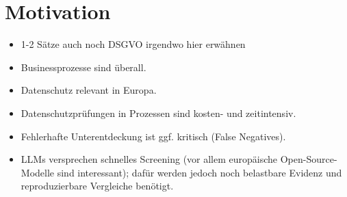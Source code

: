 \section{Motivation}\label{sec:motivation}
\begin{itemize}
    \item 1-2 Sätze auch noch DSGVO irgendwo hier erwähnen
    \item Businessprozesse sind überall.
    \item Datenschutz relevant in Europa.
    \item Datenschutzprüfungen in Prozessen sind kosten- und zeitintensiv.
    \item Fehlerhafte Unterentdeckung ist ggf. kritisch (False Negatives).
    \item LLMs versprechen schnelles Screening (vor allem europäische Open-Source-Modelle sind interessant); dafür werden jedoch noch belastbare Evidenz und reproduzierbare Vergleiche benötigt.
\end{itemize}
